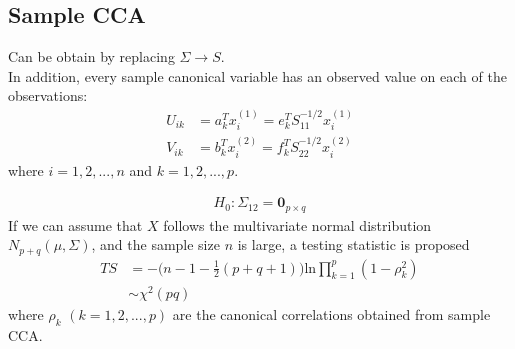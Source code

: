 \documentclass[12pt]{extarticle}
\newcommand{\<}{\langle}
\renewcommand{\>}{\rangle}
\theoremstyle{definition}
\begin{document}
\subsection{Sample CCA}
Can be obtain by replacing $\Sigma \rightarrow S$.\\

In addition, every sample canonical variable has an observed value on each of the observations:
\begin{align*}
    U_{ik} &= a_k^T x_i^{(1)} = e_k^T S_{11}^{-1/2} x_i^{(1)}\\
    V_{ik} &= b_k^T x_i^{(2)} = f_k^T S_{22}^{-1/2} x_i^{(2)}
\end{align*}
where $i=1,2,...,n$ and $k=1,2,...,p$.\\

\begin{tcolorbox}[enhanced, drop fuzzy shadow, title=Test for $\Sigma_{12}$]
\begin{align*}
    H_0: \Sigma_{12} = \textbf{0}_{p\times q}
\end{align*}
If we can assume that $X$ follows the multivariate normal distribution $N_{p+q}(\mu,\Sigma)$, and the sample size $n$ is large, a testing statistic is proposed
\begin{align*}
    TS&=-\bigg(n-1-\frac{1}{2}(p+q+1) \bigg)\text{ln}\prod^p_{k=1}(1-\rho_k^2)\\
    &\sim \chi^2(pq)
\end{align*}
where $\rho_k$ $(k=1,2,...,p)$ are the canonical correlations obtained from sample CCA.
\end{tcolorbox}
\end{document}
